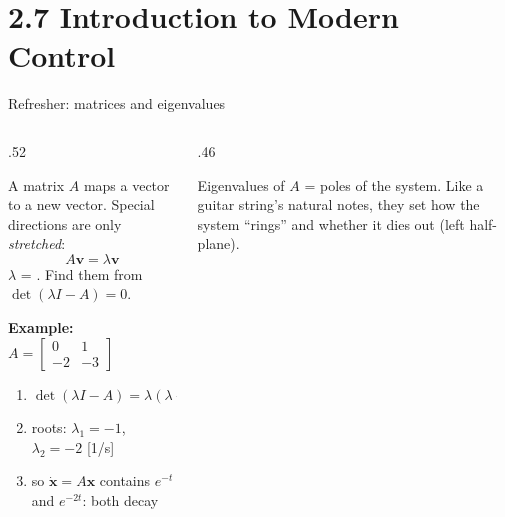 \documentclass[aspectratio=169,10pt]{beamer}
\begin{document}
\section{2.7 Introduction to Modern Control}

\begin{frame}{Refresher: matrices and eigenvalues}
\begin{columns}[T]
\begin{column}{.52\textwidth}
\begin{defbox}[Refresher: eigenvalues = natural rhythms]
A matrix $A$ maps a vector to a new vector. Special directions are only \emph{stretched}:
\[ A\bm v=\lambda\bm v \]
$\lambda$ = . Find them from $\det(\lambda I-A)=0$.
\end{defbox}
\small
\textbf{Example:} $A=\begin{bmatrix}0&1\\-2&-3\end{bmatrix}$
\begin{enumerate}\setlength\itemsep{.3mm}
\item $\det(\lambda I-A)=\lambda(\lambda+3)+2=\lambda^2+3\lambda+2$
\item roots: $\lambda_1=-1$, $\lambda_2=-2$ [1/s]
\item so $\dot{\bm x}=A\bm x$ contains $e^{-t}$ and $e^{-2t}$: both decay
\end{enumerate}
\end{column}
\begin{column}{.46\textwidth}
\centering
{}

\vspace{2mm}
\begin{keybox}
Eigenvalues of $A$ = poles of the system. Like a guitar string's natural notes, they set how the system ``rings'' and whether it dies out (left half-plane).
\end{keybox}
\end{column}
\end{columns}
\end{frame}
\end{document}
